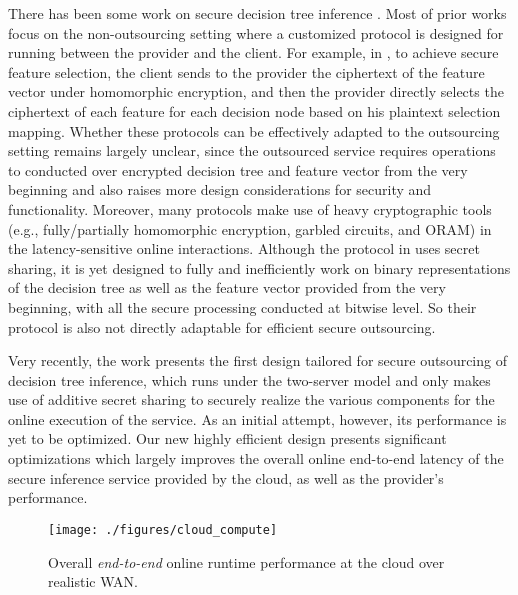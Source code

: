 \documentclass[10pt,journal,compsoc]{IEEEtran}
\begin{document}
There has been some work on secure decision tree inference \cite{BostPTG15,DWuFNL16,TaiMZC17,Cock17,TuenoKK19,TuenoBK20}.
%
Most of prior works \cite{BostPTG15,DWuFNL16,TaiMZC17,TuenoKK19,Cock17,TuenoBK20} focus on the non-outsourcing setting where a customized protocol is designed for running between the provider and the client.
%
For example, in \cite{TaiMZC17}, to achieve secure feature selection, the client sends to the provider the ciphertext of the feature vector under homomorphic encryption, and then the provider directly selects the ciphertext of each feature for each decision node based on his plaintext selection mapping.
%
Whether these protocols can be effectively adapted to the outsourcing setting remains largely unclear, since the outsourced service requires operations to conducted over encrypted decision tree and feature vector from the very beginning and also raises more design considerations for security and functionality.
%
Moreover, many protocols make use of heavy cryptographic tools (e.g., fully/partially homomorphic encryption, garbled circuits, and ORAM) in the latency-sensitive online interactions.
%
Although the protocol in \cite{Cock17} uses secret sharing, it is yet designed to fully and inefficiently work on binary representations of the decision tree as well as the feature vector provided from the very beginning, with all the secure processing conducted at bitwise level. 
%
So their protocol is also not directly adaptable for efficient secure outsourcing.
%



Very recently, the work \cite{ZhengDWWN20} presents the first design tailored for secure outsourcing of decision tree inference, which runs under the two-server model and only makes use of additive secret sharing to securely realize the various components for the online execution of the service.
% 
As an initial attempt, however, its performance is yet to be optimized.
%
Our new highly efficient design presents significant optimizations which largely improves the overall online end-to-end latency of the secure inference service provided by the cloud, as well as the provider's performance.






\begin{figure}[t!]
\centerline{\texttt{[image: ./figures/cloud\_compute]}}
\caption{Overall \emph{end-to-end} online runtime performance at the cloud over realistic WAN.}
\label{fig:cloud_compute_cost}
\end{figure}
\end{document}
